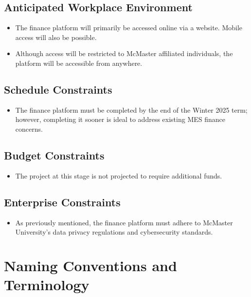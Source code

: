 \documentclass[12pt]{article}
\begin{document}
\subsection{Anticipated Workplace Environment}
\begin{itemize}
    \item The finance platform will primarily be accessed online via a website. Mobile access will also be possible. 
    \item Although access will be restricted to McMaster affiliated individuals, the platform will be accessible from anywhere.
\end{itemize}
 

\subsection{Schedule Constraints}
\begin{itemize}
    \item The finance platform must be completed by the end of the Winter 2025 term; however, completing it sooner is ideal to address existing MES finance concerns.
\end{itemize}


\subsection{Budget Constraints}
\begin{itemize}
    \item The project at this stage is not projected to require additional funds.
\end{itemize}

\subsection{Enterprise Constraints}
\begin{itemize}
    \item As previously mentioned, the finance platform must adhere to McMaster University’s data privacy regulations and cybersecurity standards.
\end{itemize}

\section{Naming Conventions and Terminology}
\end{document}
